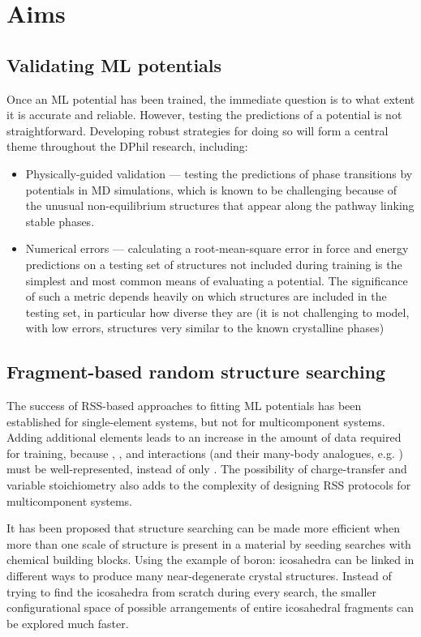 \documentclass[12pt,a4paper,twoside,nobind]{ociamthesis}
\begin{document}
\section{Aims}

\subsection*{Validating ML potentials}
Once an ML potential has been trained, the immediate question is to what extent it is accurate and reliable. However, testing the predictions of a potential is not straightforward.\autocite{Zuo2020} Developing robust strategies
for doing so will form a central theme throughout the DPhil research, including:
\begin{itemize}
  \item Physically-guided validation --- testing the predictions of phase transitions by potentials in MD simulations, which is known to be challenging because of the unusual non-equilibrium structures
        that appear along the pathway linking stable phases.\autocite{Deringer2021} 
  \item Numerical errors --- calculating a root-mean-square error in force and energy predictions on a testing set of structures not included during training is the simplest and most common means
        of evaluating a potential. The significance of such a metric depends heavily on which structures are included in the testing set, in particular how diverse they are (it is not challenging to 
        model, with low errors, structures very similar to the known crystalline phases)
\end{itemize}

\subsection*{Fragment-based random structure searching}

The success of RSS-based approaches to fitting ML potentials has been established for single-element systems, but not for multicomponent systems.
Adding additional elements leads to an increase in the amount of data required for training, because , , and  interactions (and their many-body analogues, e.g. ) must
be well-represented, instead of only . The possibility of charge-transfer and variable stoichiometry also adds to the complexity of designing RSS protocols for multicomponent systems.

It has been proposed that structure searching can be made more efficient when more than one scale of structure
is present in a material by seeding searches with chemical building blocks.\autocite{Ahnert2017, Deringer2018c, Deringer2020}
Using the example of boron: icosahedra can be linked in different ways to produce many near-degenerate crystal structures.
Instead of trying to find the icosahedra from scratch during every search, the smaller configurational space of possible arrangements of entire icosahedral fragments can be explored
much faster.
\end{document}
